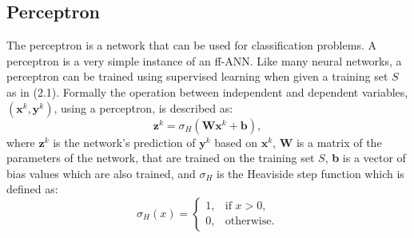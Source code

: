 \documentclass[letterpaper,12pt,titlepage,oneside,final]{book}
\begin{document}
	\subsection{Perceptron}
	
	The perceptron is a network that can be used for classification problems. A perceptron is a very simple instance of an ff-ANN. Like many neural networks, a perceptron can be trained using supervised learning when given a training set $S$ as in (2.1). Formally the operation between independent and dependent variables, $(\mathbf{x}^{k},\mathbf{y}^{k})$, using a perceptron, is described as:
	\begin{equation}
	\mathbf{z}^{k} = \sigma_{H}(\mathbf{W}\mathbf{x}^{k} + \mathbf{b}), 
	\label{equation:perceptron_output}
	\end{equation}
	where $\mathbf{z}^{k}$ is the network's prediction of $\mathbf{y}^{k}$ based on $\mathbf{x}^{k}$, $\mathbf{W}$ is a matrix of the parameters of the network, that are trained on the training set $S$, \textbf{b} is a vector of bias values which are also trained, and $\sigma_{H}$ is the Heaviside step function which is defined as:
	\begin{equation}
	\sigma_{H}(x)= 
	\begin{cases}
	1 ,& \text{if } x > 0,\\
	0,              & \text{otherwise}.
	\end{cases}
	\label{equation:heaviside_step}
	\end{equation}
	
\end{document}
